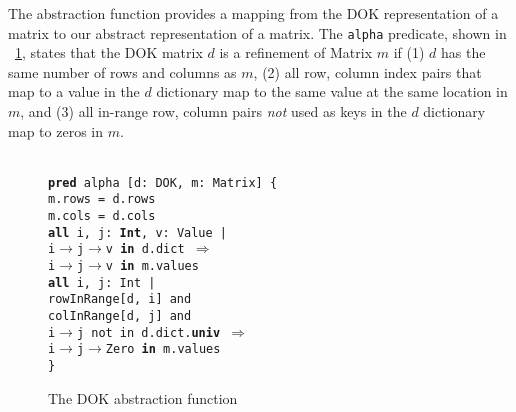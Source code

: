 \documentclass[11pt,conference]{IEEEtran}
\newenvironment{myquote}{\list{}{\leftmargin=12pt\rightmargin=0pt}\item[]}{\endlist}
\def\TA{\makebox[12pt]{}}
\def\TB{\makebox[24pt]{}}
\def\TC{\makebox[36pt]{}}
\def\Bpred{\textbf{pred} }
\def\Ball{\textbf{all} }
\def\Bin{\textbf{in} }
\def\Bimplies{$\Rightarrow$ }
\def\Bint{\textbf{Int}}
\def\Buniv{\textbf{univ}}
\begin{document}

The abstraction function provides a mapping from the DOK representation of a matrix to our abstract representation of a matrix.  The \texttt{alpha} predicate, shown in \figurename~\ref{alpha:dok}, states that the DOK matrix $d$ is a refinement of Matrix $m$ if (1) $d$ has the same number of rows and columns as $m$, (2) all row, column index pairs that map to a value in the $d$ dictionary map to the same value at the same location in $m$, and (3) all in-range row, column pairs \emph{not} used as keys in the $d$ dictionary map to zeros in $m$.

\begin{figure}
\centering
\begin{myquote}\small{\texttt{\\
\Bpred alpha [d: DOK, m: Matrix] \{\\
\TA m.rows = d.rows\\
\TA m.cols = d.cols\\
\TA \Ball i, j: \Bint, v: Value |\\
\TB i$\rightarrow$j$\rightarrow$v \Bin d.dict \Bimplies\\
\TC i$\rightarrow$j$\rightarrow$v \Bin m.values\\
\TA \Ball i, j: Int |\\
\TB rowInRange[d, i] and\\
\TB colInRange[d, j] and\\
\TB i$\rightarrow$j not in d.dict.\Buniv~\Bimplies\\
\TC i$\rightarrow$j$\rightarrow$Zero \Bin m.values\\
\}
}}
\end{myquote}
\caption{The DOK abstraction function}
\label{alpha:dok}
\end{figure}

\end{document}
